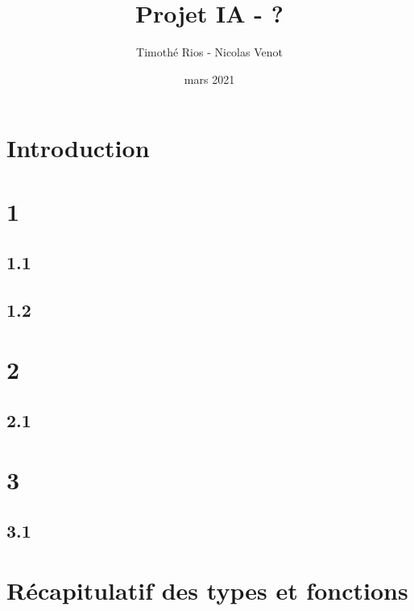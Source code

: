 \documentclass{article}
\title{Projet IA - ?}
\author{Timoth\'e Rios - Nicolas Venot}
\date{mars 2021}
\begin{document}
\maketitle
\newpage
\tableofcontents
\newpage
\setlength{\parindent}{0pt}
\section*{Introduction}

\section{1}
    \subsection{1.1}

      
    \subsection{1.2}
        
\section{2}
    \subsection{2.1}
\section{3}
    \subsection{3.1}

\appendix
\newpage
\section{R\'ecapitulatif des types et fonctions}


    
\end{document}

